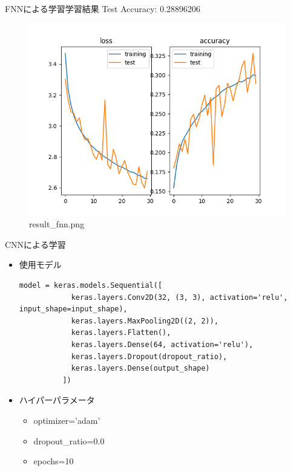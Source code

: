 \documentclass[dvipdfmx]{beamer}
\begin{document}
  \begin{frame}{FNNによる学習学習結果}
    Test Accuracy: 0.28896206
    \begin{figure}[H]
      \centering
      \includegraphics[keepaspectratio, scale=0.5]{images/train_fnn.png}
      \caption{result\_fnn.png}
    \end{figure}
  \end{frame}

  \begin{frame}[fragile]{CNNによる学習}
    \begin{itemize}
      \item 使用モデル\mbox{}\\
        \begin{lstlisting}[caption=generate\_simple\_fnn.py]
          model = keras.models.Sequential([
            keras.layers.Conv2D(32, (3, 3), activation='relu', input_shape=input_shape),
            keras.layers.MaxPooling2D((2, 2)),
            keras.layers.Flatten(),
            keras.layers.Dense(64, activation='relu'),
            keras.layers.Dropout(dropout_ratio),
            keras.layers.Dense(output_shape)
          ])
        \end{lstlisting}
      \item ハイパーパラメータ\mbox{}\\
      \begin{itemize}
        \item optimizer='adam'
        \item dropout\_ratio=0.0
        \item epochs=10
      \end{itemize}
    \end{itemize}
  \end{frame}  
\end{document}
